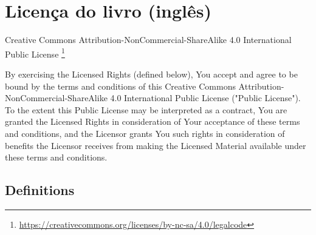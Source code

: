 {}
\chapter{Licença do livro (inglês)}

Creative Commons Attribution-NonCommercial-ShareAlike 4.0 International Public License \footnote{
\url{https://creativecommons.org/licenses/by-nc-sa/4.0/legalcode}}

By exercising the Licensed Rights (defined below), You accept and agree to be bound by the terms and conditions of this Creative Commons Attribution-NonCommercial-ShareAlike 4.0 International Public License ("Public License"). To the extent this Public License may be interpreted as a contract, You are granted the Licensed Rights in consideration of Your acceptance of these terms and conditions, and the Licensor grants You such rights in consideration of benefits the Licensor receives from making the Licensed Material available under these terms and conditions.

\section*{Definitions}

